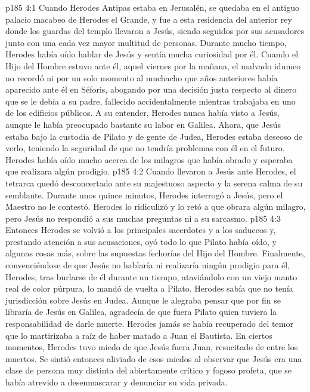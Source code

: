 \vs p185 4:1 Cuando Herodes Antipas estaba en Jerusalén, se quedaba en el antiguo palacio macabeo de Herodes el Grande, y fue a esta residencia del anterior rey donde los guardas del templo llevaron a Jesús, siendo seguidos por sus acusadores junto con una cada vez mayor multitud de personas. Durante mucho tiempo, Herodes había oído hablar de Jesús y sentía mucha curiosidad por él. Cuando el Hijo del Hombre estuvo ante él, aquel viernes por la mañana, el malvado idumeo no recordó ni por un solo momento al muchacho que años anteriores había aparecido ante él en Séforis, abogando por una decisión justa respecto al dinero que se le debía a su padre, fallecido accidentalmente mientras trabajaba en uno de los edificios públicos. A su entender, Herodes nunca había visto a Jesús, aunque le había preocupado bastante su labor en Galilea. Ahora, que Jesús estaba bajo la custodia de Pilato y de gente de Judea, Herodes estaba deseoso de verlo, teniendo la seguridad de que no tendría problemas con él en el futuro. Herodes había oído mucho acerca de los milagros que había obrado y esperaba que realizara algún prodigio.
\vs p185 4:2 Cuando llevaron a Jesús ante Herodes, el tetrarca quedó desconcertado ante su majestuoso aspecto y la serena calma de su semblante. Durante unos quince minutos, Herodes interrogó a Jesús, pero el Maestro no le contestó. Herodes lo ridiculizó y lo retó a que obrara algún milagro, pero Jesús no respondió a sus muchas preguntas ni a su sarcasmo.
\vs p185 4:3 Entonces Herodes se volvió a los principales sacerdotes y a los saduceos y, prestando atención a sus acusaciones, oyó todo lo que Pilato había oído, y algunas cosas más, sobre las supuestas fechorías del Hijo del Hombre. Finalmente, convenciéndose de que Jesús no hablaría ni realizaría ningún prodigio para él, Herodes, tras burlarse de él durante un tiempo, ataviándolo con un viejo manto real de color púrpura, lo mandó de vuelta a Pilato. Herodes sabía que no tenía jurisdicción sobre Jesús en Judea. Aunque le alegraba pensar que por fin se libraría de Jesús en Galilea, agradecía de que fuera Pilato quien tuviera la responsabilidad de darle muerte. Herodes jamás se había recuperado del temor que lo martirizaba a raíz de haber matado a Juan el Bautista. En ciertos momentos, Herodes tuvo miedo de que Jesús fuera Juan, resucitado de entre los muertos. Se sintió entonces aliviado de esos miedos al observar que Jesús era una clase de persona muy distinta del abiertamente crítico y fogoso profeta, que se había atrevido a desenmascarar y denunciar su vida privada.
